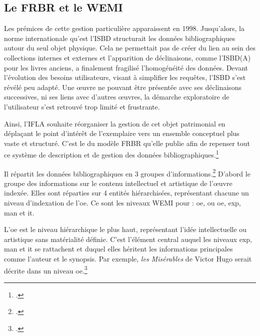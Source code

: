 \subsection{Le \gls{FRBR} et le \gls{WEMI}}

\label{FRBR-WEMI}

Les prémices de cette gestion particulière apparaissent en 1998. Jusqu'alors, la norme internationale qu'est l'ISBD structurait les données bibliographiques autour du seul objet physique. Cela ne permettait pas de créer du lien au sein des collections internes et externes et l'apparition de déclinaisons, comme l'ISBD(A) pour les livres anciens, a finalement fragilisé l'homogénéité des données. Devant l'évolution des besoins utilisateurs, visant à simplifier les requêtes, l'ISBD s'est révélé peu adapté. Une \oe{uvre} ne pouvant être présentée avec ses déclinaisons successives, ni ses liens avec d'autres \oe{uvres}, la démarche exploratoire de l'utilisateur s'est retrouvé trop limité et frustrante. 

Ainsi, l'\gls{IFLA} souhaite réorganiser la gestion de cet objet patrimonial en déplaçant le point d'intérêt de l'exemplaire vers un ensemble conceptuel plus vaste et structuré. C'est le \coeur du modèle \gls{FRBR} qu'elle publie afin de repenser tout ce système de description et de gestion des données bibliographiques.\footcite{universalbibliographiccontrolandinternationalmarcprogrammeFunctionalRequirementsBibliographic1998}\newline  

Il répartit les données bibliographiques en 3 groupes d'informations.\footcite[P.12 à 16]{universalbibliographiccontrolandinternationalmarcprogrammeFunctionalRequirementsBibliographic1998} D'abord le groupe des informations sur le contenu intellectuel et artistique de l'\oe{uvre} indexée. Elles sont réparties sur 4 entités hiérarchisées, représentant chacune un niveau d'indexation de l'\gls{oe}. Ce sont les niveaux \gls{WEMI} pour : \gls{oe}, ou \gls{oe}, \gls{exp}, \gls{man} et \gls{it}. 

L'\gls{oe} est le niveau hiérarchique le plus haut, représentant l'idée intellectuelle ou artistique sans matérialité définie. C'est l'élément central auquel les niveaux \gls{exp}, \gls{man} et \gls{it} se rattachent et duquel elles héritent les informations principales comme l'auteur et le synopsis. Par exemple, \textit{les Misérables} de Victor Hugo serait décrite dans un niveau \gls{oe}.\footcite[p.16 à 18]{universalbibliographiccontrolandinternationalmarcprogrammeFunctionalRequirementsBibliographic1998}

